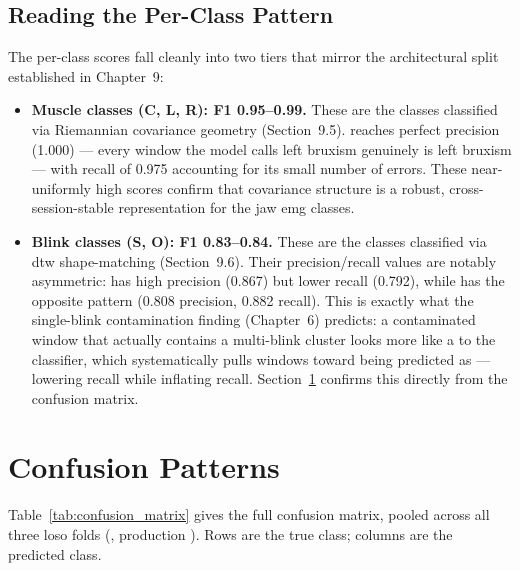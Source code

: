 \subsection{Reading the Per-Class Pattern}

The per-class scores fall cleanly into two tiers that mirror the
architectural split established in Chapter~9:

\begin{itemize}[leftmargin=*]
    \item \textbf{Muscle classes (C, L, R): F1 0.95--0.99.} These
    are the classes classified via Riemannian covariance geometry
    (Section~9.5).  reaches perfect precision
    (1.000) --- every window the model calls left bruxism genuinely
    is left bruxism --- with recall of 0.975 accounting for its
    small number of errors. These near-uniformly high scores
    confirm that covariance structure is a robust, cross-session-stable
    representation for the jaw \acrshort{emg} classes.
    \item \textbf{Blink classes (S, O): F1 0.83--0.84.} These are
    the classes classified via \acrshort{dtw} shape-matching
    (Section~9.6). Their precision/recall values are notably
    asymmetric:  has high precision (0.867) but
    lower recall (0.792), while  has the
    opposite pattern (0.808 precision, 0.882 recall). This is
    exactly what the single-blink contamination finding
    (Chapter~6) predicts: a contaminated 
    window that actually contains a multi-blink cluster looks more
    like a  to the classifier, which
    systematically pulls  windows toward being
    predicted as  --- lowering
     recall while inflating 
    recall. Section~\ref{sec:res_confusion} confirms this directly
    from the confusion matrix.
\end{itemize}

\section{Confusion Patterns}
\label{sec:res_confusion}

Table~\ref{tab:confusion_matrix} gives the full confusion matrix,
pooled across all three \acrshort{loso} folds
(, production ).
Rows are the true class; columns are the predicted class.

